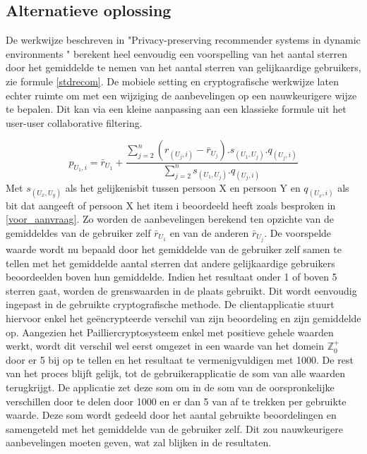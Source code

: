 \subsection{Alternatieve oplossing}
De werkwijze beschreven in "Privacy-preserving recommender systems in dynamic environments \cite{ZErkinDyn}" berekent heel eenvoudig een voorspelling van het aantal sterren door het gemiddelde te nemen van het aantal sterren van gelijkaardige gebruikers, zie formule \ref{stdrecom}. De mobiele setting en cryptografische werkwijze laten echter ruimte om met een wijziging de aanbevelingen op een nauwkeurigere wijze te bepalen. Dit kan via een kleine aanpassing aan een klassieke formule uit het user-user collaborative filtering.

\begin{equation}\label{stdrecom}p_{U_1,i} = \bar{r}_{U_1} + \frac{\sum_{j=2}^{n}(r_{(U_j,i)} - \bar{r}_{U_j}).s_{(U_1,U_j)}.q_{(U_j,i)}}{\sum_{j=2}^{n} s_{(U_1,U_j)}.q_{(U_j,i)}}
\end{equation}
Met $s_{(U_x,U_y)}$ als het gelijkenisbit tussen persoon X en persoon Y en $q_{(U_x,i)}$ als bit dat aangeeft of persoon X het item i beoordeeld heeft zoals besproken in \ref{voor_aanvraag}.
Zo worden de aanbevelingen berekend ten opzichte van de gemiddeldes van de gebruiker zelf $\bar{r}_{U_1}$ en van de anderen $\bar{r}_{U_j}$. De voorspelde waarde wordt nu bepaald door het gemiddelde van de gebruiker zelf samen te tellen met het gemiddelde aantal sterren dat andere gelijkaardige gebruikers beoordeelden boven hun gemiddelde. Indien het resultaat onder 1 of boven 5 sterren gaat, worden de grenswaarden in de plaats gebruikt.
Dit wordt eenvoudig ingepast in de gebruikte cryptografische methode. De clientapplicatie stuurt hiervoor enkel het ge\"encrypteerde verschil van zijn beoordeling en zijn gemiddelde op. Aangezien het Pailliercryptosysteem enkel met positieve gehele waarden werkt, wordt dit verschil wel eerst omgezet in een waarde van het domein $\mathbb{Z}^{+}_{0}$ door er 5 bij op te tellen en het resultaat te vermenigvuldigen met 1000. De rest van het proces blijft gelijk, tot de gebruikerapplicatie de som van alle waarden terugkrijgt. De applicatie zet deze som om in de som van de oorspronkelijke verschillen door te delen door 1000 en er dan 5 van af te trekken per gebruikte waarde. Deze som wordt gedeeld door het aantal gebruikte beoordelingen en samengeteld met het gemiddelde van de gebruiker zelf. Dit zou nauwkeurigere aanbevelingen moeten geven, wat zal blijken in de resultaten.